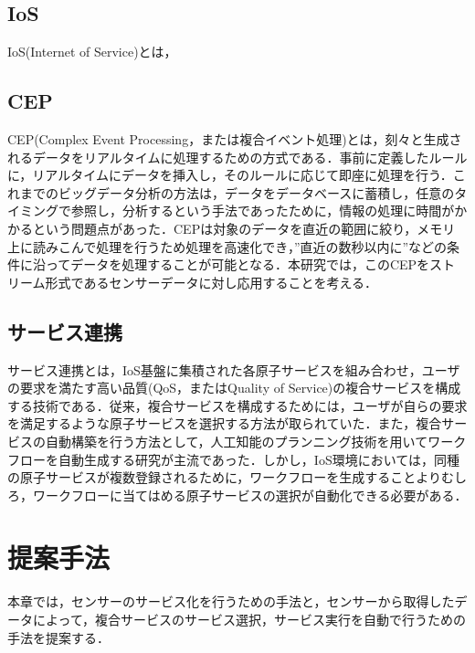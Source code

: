 \documentclass{kuisthesis}			%
\begin{document}
\subsection{IoS}\label{subsec-abstract}
IoS(Internet of Service)とは，

\subsection{CEP}
CEP(Complex Event Processing，または複合イベント処理)とは，刻々と生成されるデータをリアルタイムに処理するための方式である．事前に定義したルールに，リアルタイムにデータを挿入し，そのルールに応じて即座に処理を行う．これまでのビッグデータ分析の方法は，データをデータベースに蓄積し，任意のタイミングで参照し，分析するという手法であったために，情報の処理に時間がかかるという問題点があった．CEPは対象のデータを直近の範囲に絞り，メモリ上に読みこんで処理を行うため処理を高速化でき，”直近の数秒以内に”などの条件に沿ってデータを処理することが可能となる．本研究では，このCEPをストリーム形式であるセンサーデータに対し応用することを考える．

\subsection{サービス連携}
サービス連携とは，IoS基盤に集積された各原子サービスを組み合わせ，ユーザの要求を満たす高い品質(QoS，またはQuality of Service)の複合サービスを構成する技術である．従来，複合サービスを構成するためには，ユーザが自らの要求を満足するような原子サービスを選択する方法が取られていた．また，複合サービスの自動構築を行う方法として，人工知能のプランニング技術を用いてワークフローを自動生成する研究が主流であった．しかし，IoS環境においては，同種の原子サービスが複数登録されるために，ワークフローを生成することよりむしろ，ワークフローに当てはめる原子サービスの選択が自動化できる必要がある．

\section{提案手法}
本章では，センサーのサービス化を行うための手法と，センサーから取得したデータによって，複合サービスのサービス選択，サービス実行を自動で行うための手法を提案する．
\end{document}
